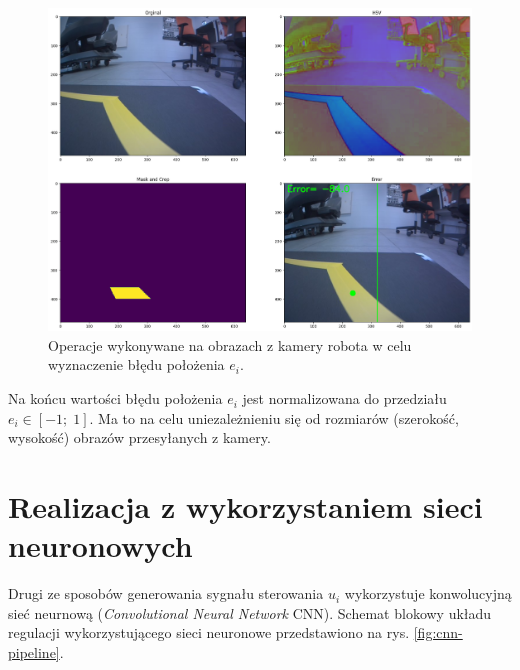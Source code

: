 \documentclass[conference]{IEEEtran}
\begin{document}
\begin{figure}[hbt!]
    \centering
    \includegraphics[width=.95\columnwidth]{img-transformation.png}
    \caption{Operacje wykonywane na obrazach z kamery robota w celu wyznaczenie błędu położenia $e_i$.}
    \label{fig:img-transformation-summary}
\end{figure}

Na końcu wartości błędu położenia $e_i$ jest normalizowana do przedziału $e_i \in [-1;\;1]$. Ma to na celu uniezależnieniu się od rozmiarów (szerokość, wysokość) obrazów przesyłanych z kamery.


\section{Realizacja z wykorzystaniem sieci neuronowych}\label{sec:nn-controller}
Drugi ze sposobów generowania sygnału sterowania $u_i$ wykorzystuje konwolucyjną sieć neurnową (\emph{Convolutional Neural Network} CNN). Schemat blokowy układu regulacji wykorzystującego sieci neuronowe przedstawiono na rys. \ref{fig:cnn-pipeline}.
\end{document}
